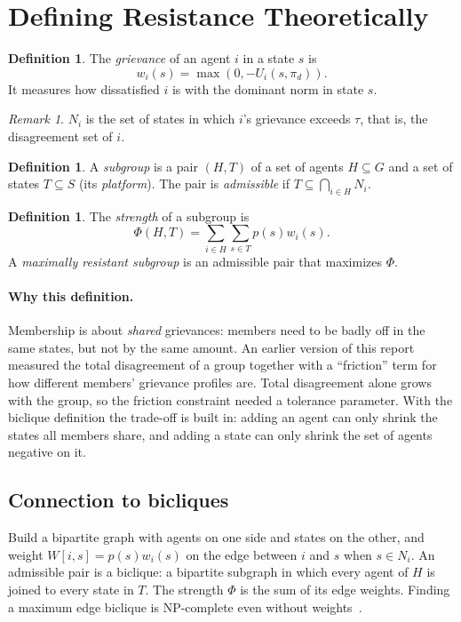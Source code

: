 \documentclass[11pt]{article}
\theoremstyle{plain}
\theoremstyle{definition}
\newtheorem{definition}[theorem]{Definition}
\theoremstyle{remark}
\newtheorem{remark}[theorem]{Remark}
\begin{document}
\section{Defining Resistance Theoretically}\label{sec:def}
\begin{definition}
    The \emph{grievance} of an agent $i$ in a state $s$ is
    \[ w_i(s) = \max(0, -U_i(s,\pi_d)). \]
    It measures how dissatisfied $i$ is with the dominant norm in state $s$.
\end{definition}
\begin{remark}
    $N_i$ is the set of states in which $i$'s grievance exceeds $\tau$, that is, the disagreement set of $i$.
\end{remark}
\begin{definition}
    A \emph{subgroup} is a pair $(H, T)$ of a set of agents $H \subseteq G$ and a set of states $T \subseteq S$ (its \emph{platform}).
    The pair is \emph{admissible} if $T \subseteq \bigcap_{i \in H}N_i$.
\end{definition}
\begin{definition}
    The \emph{strength} of a subgroup is
    \[ \Phi(H, T) = \sum_{i \in H}\sum_{s \in T}p(s)w_i(s). \]
    A \emph{maximally resistant subgroup} is an admissible pair that maximizes $\Phi$.
\end{definition}
 
\paragraph{Why this definition.} Membership is about \emph{shared} grievances: members need to be badly off in the same states, but not
by the same amount. An earlier version of this report measured the total disagreement of a group together with a ``friction'' term for how different
members' grievance profiles are. Total disagreement alone grows with the group, so the friction constraint needed a tolerance parameter.
With the biclique definition the trade-off is built in: adding an agent can only shrink the states all members share, and adding a state can only shrink the set of agents negative on it.
 
\subsection{Connection to bicliques}
Build a bipartite graph with agents on one side and states on the other, and weight $W[i, s] = p(s)w_i(s)$ on the edge between $i$ and $s$ when $s \in N_i$.
An admissible pair is a biclique: a bipartite subgraph in which every agent of $H$ is joined to every state in $T$.
The strength $\Phi$ is the sum of its edge weights. Finding a maximum edge biclique is NP-complete even without weights~\cite{peeters}.
 
\end{document}
